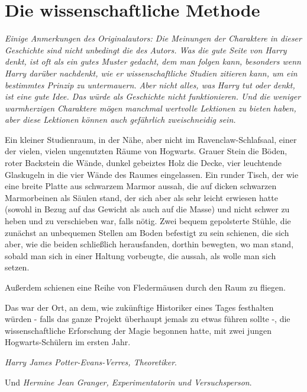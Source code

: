 \chapter{Die wissenschaftliche Methode}

\emph{Einige Anmerkungen des Originalautors: Die Meinungen der Charaktere in
dieser Geschichte sind nicht unbedingt die des Autors. Was die gute Seite von
Harry denkt, ist oft als ein gutes Muster gedacht, dem man folgen kann,
besonders wenn Harry darüber nachdenkt, wie er wissenschaftliche Studien
zitieren kann, um ein bestimmtes Prinzip zu untermauern. Aber nicht alles, was
Harry tut oder denkt, ist eine gute Idee. Das würde als Geschichte nicht
funktionieren. Und die weniger warmherzigen Charaktere mögen manchmal wertvolle
Lektionen zu bieten haben, aber diese Lektionen können auch gefährlich
zweischneidig sein.}

Ein kleiner Studienraum, in der Nähe, aber nicht im Ravenclaw-Schlafsaal, einer
der vielen, vielen ungenutzten Räume von Hogwarts. Grauer Stein die Böden, roter
Backstein die Wände, dunkel gebeiztes Holz die Decke, vier leuchtende Glaskugeln
in die vier Wände des Raumes eingelassen. Ein runder Tisch, der wie eine breite
Platte aus schwarzem Marmor aussah, die auf dicken schwarzen Marmorbeinen als
Säulen stand, der sich aber als sehr leicht erwiesen hatte (sowohl in Bezug auf
das Gewicht als auch auf die Masse) und nicht schwer zu heben und zu verschieben
war, falls nötig. Zwei bequem gepolsterte Stühle, die zunächst an unbequemen
Stellen am Boden befestigt zu sein schienen, die sich aber, wie die beiden
schließlich herausfanden, dorthin bewegten, wo man stand, sobald man sich in
einer Haltung vorbeugte, die aussah, als wolle man sich setzen.

Außerdem schienen eine Reihe von Fledermäusen durch den Raum zu fliegen.

Das war der Ort, an dem, wie zukünftige Historiker eines Tages festhalten würden
- falls das ganze Projekt überhaupt jemals zu etwas führen sollte -, die
wissenschaftliche Erforschung der Magie begonnen hatte, mit zwei jungen
Hogwarts-Schülern im ersten Jahr.

\emph{Harry James Potter-Evans-Verres, Theoretiker}.

Und \emph{Hermine Jean Granger, Experimentatorin und Versuchsperson}.

